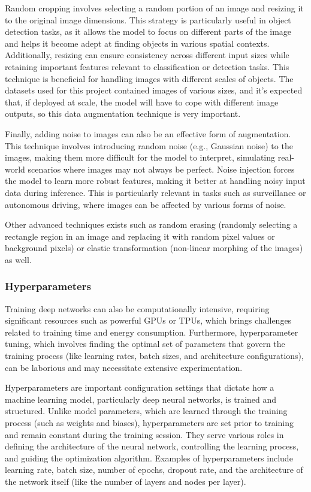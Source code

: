 \documentclass[12pt]{article}
\begin{document}
Random cropping involves selecting a random portion of an image and resizing it to the original image dimensions. This strategy is particularly useful in object detection tasks, as it allows the model to focus on different parts of the image and helps it become adept at finding objects in various spatial contexts. Additionally, resizing can ensure consistency across different input sizes while retaining important features relevant to classification or detection tasks. This technique is beneficial for handling images with different scales of objects. The datasets used for this project contained images of various sizes, and it's expected that, if deployed at scale, the model will have to cope with different image outputs, so this data augmentation technique is very important.

Finally, adding noise to images can also be an effective form of augmentation. This technique involves introducing random noise (e.g., Gaussian noise) to the images, making them more difficult for the model to interpret, simulating real-world scenarios where images may not always be perfect. Noise injection forces the model to learn more robust features, making it better at handling noisy input data during inference. This is particularly relevant in tasks such as surveillance or autonomous driving, where images can be affected by various forms of noise.

Other advanced techniques exists such as random erasing (randomly selecting a rectangle region in an image and replacing it with random pixel values or background pixels) or elastic transformation (non-linear morphing of the images) as well.

\subsubsection{Hyperparameters}

Training deep networks can also be computationally intensive, requiring significant resources such as powerful GPUs or TPUs, which brings challenges related to training time and energy consumption. Furthermore, hyperparameter tuning, which involves finding the optimal set of parameters that govern the training process (like learning rates, batch sizes, and architecture configurations), can be laborious and may necessitate extensive experimentation.

Hyperparameters are important configuration settings that dictate how a machine learning model, particularly deep neural networks, is trained and structured. Unlike model parameters, which are learned through the training process (such as weights and biases), hyperparameters are set prior to training and remain constant during the training session. They serve various roles in defining the architecture of the neural network, controlling the learning process, and guiding the optimization algorithm. Examples of hyperparameters include learning rate, batch size, number of epochs, dropout rate, and the architecture of the network itself (like the number of layers and nodes per layer).
\end{document}
